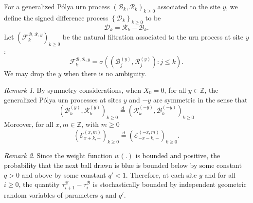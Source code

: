 \documentclass[twoside,12pt, a4paper]{article}
\numberwithin{equation}{section}
\theoremstyle{remark}
\newtheorem{remark}{Remark}[section]
\begin{document}
	For a generalized P\'{o}lya urn process $(\mathcal{B}_k,\mathcal{R}_k )_{k\geq 0}$ associated to the site $y$, we define the signed difference process $\left\{\mathcal{D}_{k}\right\}_{k \ge 0} $ to be
	\begin{equation}\label{eq:signed difference}
		\mathcal{D}_k  =\mathcal{R}_k -\mathcal{B}_k.  
	\end{equation}
	Let $\left(\mathcal{F}^{\mathcal{B},\mathcal{R}, y}_{k}\right)_{k \ge 0}$ be the natural filtration associated to the urn process at site $y$:  
	\[
		\mathcal{F}^{\mathcal{B},\mathcal{R}, y}_{k} = \sigma\left((\mathcal{B}_j^{(y)},\mathcal{R}_j^{(y)} ): j\leq k \right).
	\]  
	We may drop the $y$ when there is no ambiguity.
	\begin{remark}
		\label{rem:symmetry}
		By symmetry considerations, when $X_0 = 0$, for all $y \in \mathbb{Z}$, the generalized P\'{o}lya urn processes at sites $y$ and $-y$ are symmetric in the sense that
		$$\left(\mathcal{B}^{(y)}_{k},\mathcal{R}^{(y)}_{k} \right)_{k\ge 0}
		\overset{d}{=} 
		\left(\mathcal{R}^{(-y)}_{k},\mathcal{B}^{(-y)}_{k} \right)_{k\ge 0} $$
		Moreover, for all $x, m \in \mathbb{Z}$, with $m\geq 0$
		\[
		\left(\mathcal{E}^{(x,m)}_{x+k,+} \right)_{k\geq 0} \overset{d}{=} \left(\mathcal{E}^{(-x,m)}_{-x-k,-} \right)_{k\geq 0}.
		\]
	\end{remark}
	\begin{remark}
		\label{rk:UrnGeo}
	Since the weight function $w(.)$ is bounded and positive, the probability that the next ball drawn is blue is bounded below by some constant $q > 0$ and above by some constant $q' < 1$. Therefore, at each site $y$ and for all $i \ge 0$, the quantity $\tau_{i+1}^{\mathcal{B}} - \tau_{i}^{\mathcal{B}}$ is stochastically bounded by independent geometric random variables of parameters $q$ and $q'$. 
	\end{remark}
\end{document}
